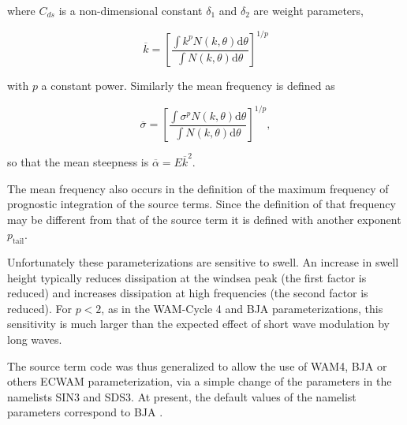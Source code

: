 \noindent
where $C_{ds}$ is a non-dimensional constant $\delta_1$ and $\delta_2$ are
weight parameters,

\begin{equation}
\overline{k}=\left[\frac{\int k^p N\left(k,\theta\right) {\mathrm d}
\theta}{\int N\left(k,\theta\right) {\mathrm d} \theta}\right]^{1/p}
\end{equation}

\noindent
with $p$ a constant power. Similarly the mean frequency is defined as

\begin{equation}
\overline{\sigma}=\left[\frac{\int \sigma^p N\left(k,\theta\right) {\mathrm d}
\theta}{ \int N\left(k,\theta\right) {\mathrm d} \theta}\right]^{1/p},
\end{equation}

\noindent
so that the mean steepness is $\overline{\alpha}=E \overline{k}^2$.

The mean frequency also occurs in the definition of the maximum frequency of
prognostic integration of the source terms. Since the definition of that
frequency may be different from that of the source term it is defined with
another exponent $p_{\mathrm{tail}}$.

Unfortunately these parameterizations are sensitive to swell. An increase in
swell height typically reduces dissipation at the windsea peak (the first
factor is reduced) and increases dissipation at high frequencies (the second
factor is reduced). For $p< 2$, as in the WAM-Cycle 4 and BJA
parameterizations, this sensitivity is much larger than the expected effect of
short wave modulation by long waves.

The source term code was thus generalized to
allow the use of WAM4, BJA or others ECWAM parameterization, via a simple change of
the parameters in the namelists SIN3 and SDS3. At present, the default values of the namelist
parameters correspond to BJA \citep{rep:Bea05}.

